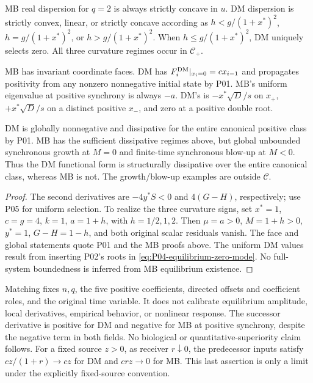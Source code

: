 \begin{proposition}
\label{prop:P08-structural}
MB real dispersion for $q=2$ is always strictly concave in $u$.
DM dispersion is strictly convex, linear, or strictly concave according
as $h<g/(1+x^*)^2$, $h=g/(1+x^*)^2$, or $h>g/(1+x^*)^2$.
When $h\le g/(1+x^*)^2$, DM uniquely selects zero. All three
curvature regimes occur in $\mathcal C_+$.

MB has invariant coordinate faces. DM has
$F_i^{\mathrm{DM}}|_{x_i=0}=cx_{i-1}$ and propagates positivity from any nonzero
nonnegative initial state by P01. MB's uniform eigenvalue at positive synchrony is
always $-a$. DM's is $-x^*\sqrt D/s$ on $x_+$,
$+x^*\sqrt D/s$ on a distinct positive $x_-$, and zero at a positive
double root.

DM is globally nonnegative and dissipative for the entire canonical
positive class by P01. MB has the sufficient dissipative regimes above,
but global unbounded synchronous growth at $M=0$ and finite-time
synchronous blow-up at $M<0$. Thus the DM functional form is
structurally dissipative over the entire canonical class, whereas MB is
not. The growth/blow-up examples are outside $\mathcal C$.
\end{proposition}
\begin{proof}
The second derivatives are $-4y^*S<0$ and $4(G-H)$, respectively;
use P05 for uniform selection. To realize the three curvature signs,
set $x^*=1$, $c=g=4$, $k=1$, $a=1+h$, with $h=1/2,1,2$.
Then $\mu=a>0$, $M=1+h>0$, $y^*=1$, $G-H=1-h$, and both
original scalar residuals vanish. The face and global statements quote
P01 and the MB proofs above. The uniform DM values result from inserting
P02's roots in \eqref{eq:P04-equilibrium-zero-mode}. No full-system
boundedness is inferred from MB equilibrium existence.
\end{proof}
\begin{remark}
Matching fixes $n,q$, the five positive coefficients, directed offsets
and coefficient roles, and the original time variable. It does not
calibrate equilibrium amplitude, local derivatives, empirical behavior,
or nonlinear response. The successor derivative is positive for DM and
negative for MB at positive synchrony, despite the negative term in both
fields. No biological or quantitative-superiority claim follows.
For a fixed source $z>0$, as receiver $r\downarrow0$, the predecessor
inputs satisfy $cz/(1+r)\to cz$ for DM and $crz\to0$ for MB.
This last assertion is only a limit under the explicitly fixed-source
convention.
\end{remark}

